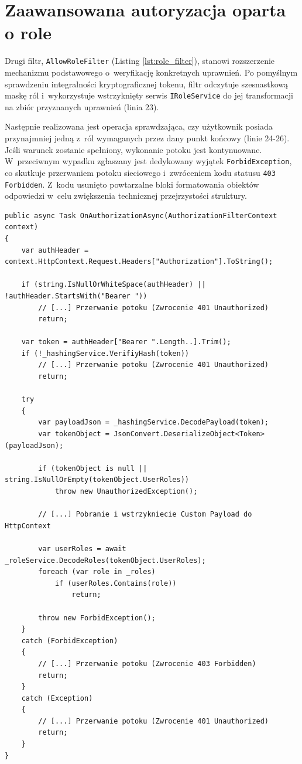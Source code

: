 \documentclass{SGGW-thesis}
\begin{document}
\section{Zaawansowana autoryzacja oparta o role}

Drugi filtr, \texttt{AllowRoleFilter} (Listing \ref{lst:role_filter}), stanowi rozszerzenie mechanizmu podstawowego o~weryfikację konkretnych uprawnień. Po pomyślnym sprawdzeniu integralności kryptograficznej tokenu, filtr odczytuje szesnastkową maskę ról i~wykorzystuje wstrzyknięty serwis \texttt{IRoleService} do jej transformacji na zbiór przyznanych uprawnień (linia 23).

Następnie realizowana jest operacja sprawdzająca, czy użytkownik posiada przynajmniej jedną z~ról wymaganych przez dany punkt końcowy (linie 24-26). Jeśli warunek zostanie spełniony, wykonanie potoku jest kontynuowane. W~przeciwnym wypadku zgłaszany jest dedykowany wyjątek \texttt{ForbidException}, co skutkuje przerwaniem potoku sieciowego i~zwróceniem kodu statusu \texttt{403 Forbidden}. Z~kodu usunięto powtarzalne bloki formatowania obiektów odpowiedzi w~celu zwiększenia technicznej przejrzystości struktury.

\begin{lstlisting}[caption={Filtr HTTP weryfikujący binarne role użytkownika}, label={lst:role_filter}]
public async Task OnAuthorizationAsync(AuthorizationFilterContext context)
{
    var authHeader = context.HttpContext.Request.Headers["Authorization"].ToString();

    if (string.IsNullOrWhiteSpace(authHeader) || !authHeader.StartsWith("Bearer "))
        // [...] Przerwanie potoku (Zwrocenie 401 Unauthorized)
        return;

    var token = authHeader["Bearer ".Length..].Trim();
    if (!_hashingService.VerifiyHash(token))
        // [...] Przerwanie potoku (Zwrocenie 401 Unauthorized)
        return;

    try
    {
        var payloadJson = _hashingService.DecodePayload(token);
        var tokenObject = JsonConvert.DeserializeObject<Token>(payloadJson);
        
        if (tokenObject is null || string.IsNullOrEmpty(tokenObject.UserRoles))
            throw new UnauthorizedException();

        // [...] Pobranie i wstrzykniecie Custom Payload do HttpContext

        var userRoles = await _roleService.DecodeRoles(tokenObject.UserRoles);
        foreach (var role in _roles)
            if (userRoles.Contains(role))
                return;
        
        throw new ForbidException();
    }
    catch (ForbidException)
    {
        // [...] Przerwanie potoku (Zwrocenie 403 Forbidden)
        return;
    }
    catch (Exception)
    {
        // [...] Przerwanie potoku (Zwrocenie 401 Unauthorized)
        return;
    }
}
\end{lstlisting}
\end{document}
